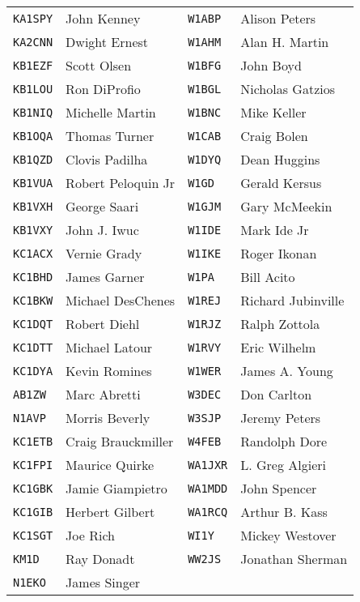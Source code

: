 \documentclass[10pt,letterpaper]{article}
\begin{document}
\begin{enumerate}
\begin{enumerate}
\begin{tabular}{|ll||ll|}
  \texttt{KA1SPY} & John Kenney         & \texttt{W1ABP}  & Alison Peters       \\
  \texttt{KA2CNN} & Dwight Ernest       & \texttt{W1AHM}  & Alan H. Martin      \\
  \texttt{KB1EZF} & Scott Olsen         & \texttt{W1BFG}  & John Boyd           \\
  \texttt{KB1LOU} & Ron DiProfio        & \texttt{W1BGL}  & Nicholas Gatzios    \\
  \texttt{KB1NIQ} & Michelle Martin     & \texttt{W1BNC}  & Mike Keller         \\
  \texttt{KB1OQA} & Thomas Turner       & \texttt{W1CAB}  & Craig Bolen         \\
  \texttt{KB1QZD} & Clovis Padilha      & \texttt{W1DYQ}  & Dean  Huggins       \\
  \texttt{KB1VUA} & Robert Peloquin Jr  & \texttt{W1GD}   & Gerald  Kersus      \\
  \texttt{KB1VXH} & George Saari        & \texttt{W1GJM}  & Gary McMeekin       \\
  \texttt{KB1VXY} & John J. Iwuc        & \texttt{W1IDE}  & Mark Ide Jr         \\
  \texttt{KC1ACX} & Vernie Grady        & \texttt{W1IKE}  & Roger Ikonan        \\
  \texttt{KC1BHD} & James Garner        & \texttt{W1PA}   & Bill Acito          \\
  \texttt{KC1BKW} & Michael DesChenes   & \texttt{W1REJ}  & Richard Jubinville  \\
  \texttt{KC1DQT} & Robert Diehl        & \texttt{W1RJZ}  & Ralph Zottola       \\
  \texttt{KC1DTT} & Michael Latour      & \texttt{W1RVY}  & Eric  Wilhelm       \\
  \texttt{KC1DYA} & Kevin Romines       & \texttt{W1WER}  & James A. Young      \\
  \texttt{AB1ZW}  & Marc Abretti        & \texttt{W3DEC}  & Don Carlton         \\
  \texttt{N1AVP}  & Morris Beverly      & \texttt{W3SJP}  & Jeremy Peters       \\
  \texttt{KC1ETB} & Craig Brauckmiller  & \texttt{W4FEB}  & Randolph Dore       \\
  \texttt{KC1FPI} & Maurice Quirke      & \texttt{WA1JXR} & L. Greg Algieri     \\
  \texttt{KC1GBK} & Jamie Giampietro    & \texttt{WA1MDD} & John Spencer        \\
  \texttt{KC1GIB} & Herbert Gilbert     & \texttt{WA1RCQ} & Arthur B. Kass      \\
  \texttt{KC1SGT} & Joe Rich            & \texttt{WI1Y}   & Mickey Westover     \\
  \texttt{KM1D}   & Ray Donadt          & \texttt{WW2JS}  & Jonathan Sherman    \\
  \texttt{N1EKO}  & James Singer        &                 &                     \\
  \hline
  \end{tabular}


\end{enumerate}
\end{enumerate}
\end{document}
